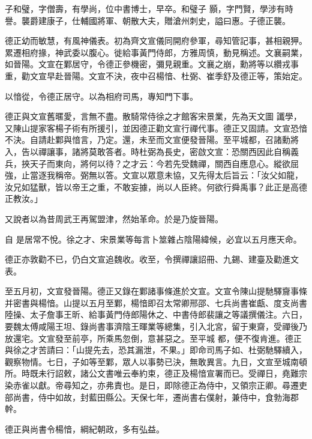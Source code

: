 \begin{pinyinscope}
 子和璧，字僧壽，有學尚，位中書博士，早卒。和璧子
 顥，字門賢，學涉有時譽。襲爵建康子，仕輔國將軍、朝散大夫，贈滄州刺史，謚曰惠。子德正襲。



 德正幼而敏慧，有風神儀表。初為齊文宣儀同開府參軍，尋知管記事，甚相親狎。累遷相府掾，神武委以腹心。徙給事黃門侍郎，方雅周慎，動見稱述。文襄嗣業，如晉陽。文宣在鄴居守，令德正參機密，彌見親重。文襄之崩，勳將等以纘戎事重，勸文宣早赴晉陽。文宣不決，夜中召楊愔、杜弼、崔季舒及德正等，策始定。



 以愔從，令德正居守。以為相府司馬，專知門下事。



 德正與文宣舊暱愛，言無不盡。散騎常侍徐之才館客宋景業，先為天文圖
 讖學，又陳山提家客楊子術有所援引，並因德正勸文宣行禪代事。德正又固請。文宣恐愔不決。自請赴鄴與愔言，乃定。還，未至而文宣便發晉陽。至平城都，召諸勳將入，告以禪讓事，諸將莫敢答者。時杜弼為長史，密啟文宣：恐關西因此自稱義兵，挾天子而東向，將何以待？之才云：今若先受魏禪，關西自應息心。縱欲屈強，止當逐我稱帝。弼無以答。文宣以眾意未協，又先得太后旨云：「汝父如龍，汝兄如猛獸，皆以帝王之重，不敢妄據，尚以人臣終。何欲行舜禹事？此正是高德正教汝。」



 又說者以為昔周武王再駕盟津，然始革命。於是乃旋晉陽。



 自
 是居常不悅。徐之才、宋景業等每言卜筮雜占陰陽緯候，必宜以五月應天命。



 德正亦敦勸不已，仍白文宣追魏收。收至，令撰禪讓詔冊、九錫、建臺及勸進文表。



 至五月初，文宣發晉陽。德正又錄在鄴諸事條進於文宣。文宣令陳山提馳驛齎事條并密書與楊愔。山提以五月至鄴，楊愔即召太常卿邢邵、七兵尚書崔甗、度支尚書陸操、太子詹事王昕、給事黃門侍郎陽休之、中書侍郎裴讓之等議撰儀注。六日，要魏太傅咸陽王坦、錄尚書事濟陰王暉業等總集，引入北宮，留于東齋，受禪後乃放還宅。文宣發至前亭，所乘馬忽倒，意甚惡之。至平城
 都，便不復肯進。德正與徐之才苦請曰：「山提先去，恐其漏泄，不果。」即命司馬子如、杜弼馳驛續入，觀察物情。七日，子如等至鄴，眾人以事勢已決，無敢異言。九日，文宣至城南頓所。時既未行詔敕，諸公文書唯云奉約束，德正及楊愔宣署而已。受禪日，堯難宗染赤雀以獻。帝尋知之，亦弗責也。是日，即除德正為侍中，又領宗正卿。尋遷吏部尚書，侍中如故，封藍田縣公。天保七年，遷尚書右僕射，兼侍中，食勃海郡幹。



 德正與尚書令楊愔，綱紀朝政，多有弘益。




\end{pinyinscope}
